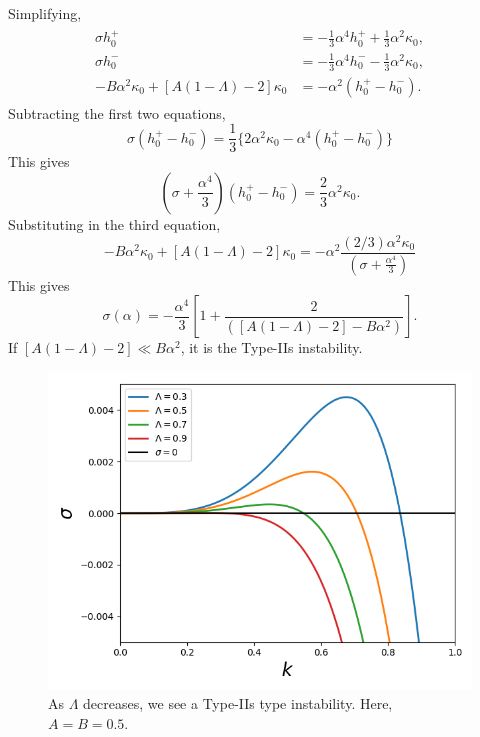 \documentclass{article}
\newcommand{\hp}{h^{+}}
\newcommand{\hm}{h^{-}}
\begin{document}
%
Simplifying,
\begin{align}
\begin{split}
 \sigma \hp_{0} & = - \frac{1}{3}\alpha^{4}\hp_{0} + \frac{1}{3} \alpha^{2} \kappa_{0}, \\
 \sigma \hm_{0} & = - \frac{1}{3}\alpha^{4}\hm_{0} - \frac{1}{3} \alpha^{2} \kappa_{0}, \\
 -B\alpha^{2}\kappa_{0} + [A(1-\Lambda)-2]\kappa_{0} &= -\alpha^{2}(\hp_{0} - \hm_{0}).
\end{split}
\end{align}
%
Subtracting the first two equations,
\begin{equation}
\sigma (\hp_{0} - \hm_{0}) = \frac{1}{3} \{2 \alpha^{2} \kappa_{0} - \alpha^{4}(\hp_{0} - \hm_{0}) \} 
\end{equation}
%
This gives 
\begin{equation}
 (\sigma + \frac{\alpha^{4}}{3})(\hp_{0} - \hm_{0}) = \frac{2}{3}\alpha^{2}\kappa_{0}.
\end{equation}
%
Substituting in the third equation,
\begin{equation}
  -B\alpha^{2}\kappa_{0} + [A(1-\Lambda)-2]\kappa_{0} = -\alpha^{2} \frac{(2/3)\alpha^{2}\kappa_{0}}{(\sigma + \frac{\alpha^{4}}{3})}
\end{equation}
This gives
\begin{equation}\label{eq:thin_film_disp_reln}
 \boxed{ \sigma(\alpha) = -\frac{\alpha^{4}}{3} \left[1 + \frac{2}{([A(1-\Lambda)-2] - B\alpha^{2})} \right] }. 
\end{equation}
If $[A(1-\Lambda)-2] \ll B\alpha^{2}$, it is the Type-IIs instability. 
\begin{figure}[H]
    \centering
    \includegraphics[scale = 0.5]{Figs/thin_liq_films_deformable_substrate_dispersion_reln.png}
    \caption{As $\Lambda$ decreases, we see a Type-IIs type instability. Here, $A = B = 0.5$.}
    \label{fig:thin_liq_films_deformable_substrate_dispersion_reln}
\end{figure}
\end{document}
